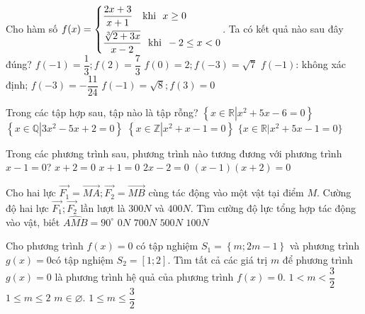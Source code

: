 \begin{ex}%
	Cho hàm số $f(x)=\left\{\begin{aligned}
		& \dfrac{2x+3}{x+1} \,\,\,\,\,\,\text{khi }\,\,x\ge 0 \\ 
		& \dfrac{\sqrt[3]{2+3x}}{x-2}\,\,\,\,\text{khi }\,-2\le x<0 \\\end{aligned}\right.$. Ta có kết quả nào sau đây đúng?
	\choice
	{\True $f\left(-1\right)=\dfrac{1}{3};f(2)=\dfrac{7}{3}$}
	{$f(0)=2;f\left(-3\right)=\sqrt{7}$}
	{$f\left(-1\right)$: không xác định; $f\left(-3\right)=-\dfrac{11}{24}$}
	{$f\left(-1\right)=\sqrt{8};f(3)=0$}
\end{ex}
\begin{ex}%
	Trong các tập hợp sau, tập nào là tập rỗng?
	\choice
	{$\left\{x\in \mathbb{R}\left| x^2+5x-6=0\right.\right\}$}
	{$\left\{x\in \mathbb{Q}\left| 3x^2-5x+2=0\right.\right\}$}
	{\True $\left\{x\in \mathbb{Z}\left| x^2+x-1=0\right.\right\}$}
	{$\{x\in \mathbb{R}|x^2 + 5x -1 =0\}$}
\end{ex}
\begin{ex}%
	Trong các phương trình sau, phương trình nào tương đương với phương trình $x-1=0$?
	\choice
	{$x+2=0$}
	{$x+1=0$}
	{\True $2x-2=0$}
	{$(x-1)(x+2)=0$}
\end{ex}
\begin{ex}%
	Cho hai lực $\overrightarrow{F_1}=\overrightarrow{MA};\overrightarrow{F_2}=\overrightarrow{MB}$ cùng tác động vào một vật tại điểm $M$. Cường độ hai lực $\overrightarrow{F_1};\overrightarrow{F_2}$ lần lượt là $300N$ và $400N.$ Tìm cường độ lực tổng hợp tác động vào vật, biết  $\widehat{AMB}=90^{\circ}$
	\choice
	{$ 0N$}
	{$700N$}
	{\True $500N$}
	{$100N$}
\end{ex}
\begin{ex}%
	Cho phương trình $f(x)=0$ có tập nghiệm $S_1=\left\{m;2m-1\right\}$ và phương trình $g(x)=0$có tập nghiệm $S_2=\left[1;2\right]$. Tìm tất cả các giá trị $m$ để phương trình $g(x)=0$ là phương trình hệ quả của phương trình  $f(x)=0$.
	\choice
	{$1<m<\dfrac{3}{2}$}
	{$1\le m\le 2$}
	{$m\in \varnothing.$}
	{ \True $1\le m\le \dfrac{3}{2}$}
\end{ex}
